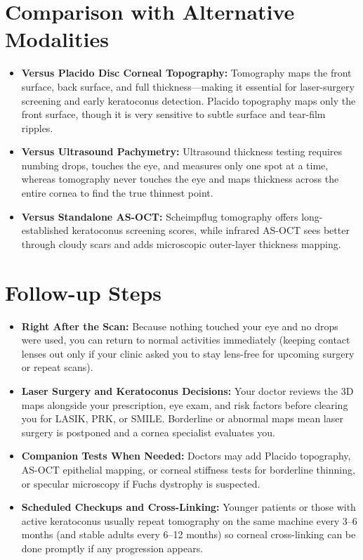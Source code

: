 \section{Comparison with Alternative Modalities}
\begin{itemize}
    \item \textbf{Versus Placido Disc Corneal Topography:} Tomography maps the front surface, back surface, and full thickness---making it essential for laser-surgery screening and early keratoconus detection. Placido topography maps only the front surface, though it is very sensitive to subtle surface and tear-film ripples.
    \item \textbf{Versus Ultrasound Pachymetry:} Ultrasound thickness testing requires numbing drops, touches the eye, and measures only one spot at a time, whereas tomography never touches the eye and maps thickness across the entire cornea to find the true thinnest point.
    \item \textbf{Versus Standalone AS-OCT:} Scheimpflug tomography offers long-established keratoconus screening scores, while infrared AS-OCT sees better through cloudy scars and adds microscopic outer-layer thickness mapping.
\end{itemize}

\section{Follow-up Steps}
\begin{itemize}
    \item \textbf{Right After the Scan:} Because nothing touched your eye and no drops were used, you can return to normal activities immediately (keeping contact lenses out only if your clinic asked you to stay lens-free for upcoming surgery or repeat scans).
    \item \textbf{Laser Surgery and Keratoconus Decisions:} Your doctor reviews the 3D maps alongside your prescription, eye exam, and risk factors before clearing you for LASIK, PRK, or SMILE. Borderline or abnormal maps mean laser surgery is postponed and a cornea specialist evaluates you.
    \item \textbf{Companion Tests When Needed:} Doctors may add Placido topography, AS-OCT epithelial mapping, or corneal stiffness tests for borderline thinning, or specular microscopy if Fuchs dystrophy is suspected.
    \item \textbf{Scheduled Checkups and Cross-Linking:} Younger patients or those with active keratoconus usually repeat tomography on the same machine every 3--6 months (and stable adults every 6--12 months) so corneal cross-linking can be done promptly if any progression appears.
\end{itemize}


